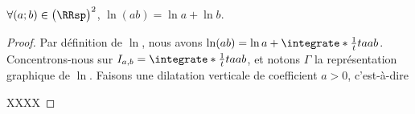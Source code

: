 \begin{fact}
	$\forall (a;b) \in \big( \RRsp \big)^2$,
	$\ln(a b) = \ln a + \ln b$.
\end{fact}


\begin{proof}
	Par définition de $\ln$, nous avons 
	$\ln(a b) = \ln a + \integrate*{\frac1t}{t}{a}{ab}$.
	Concentrons-nous sur $I_{a,b} = \integrate*{\frac1t}{t}{a}{ab}$,
	et
	notons $\Gamma$ la représentation graphique  de $\ln$.
	Faisons une dilatation verticale de coefficient $a>0$, c'est-à-dire
	
	XXXX
\end{proof}
